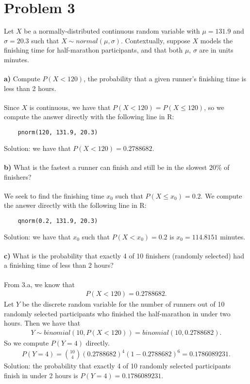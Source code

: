 \documentclass[11pt, letterpaper]{article}
\begin{document}
\section*{Problem 3}
Let $X$ be a normally-distributed continuous random variable with $\mu=131.9$ and $\sigma=20.3$ such that
$X\sim normal(\mu,\sigma)$. Contextually, suppose $X$ models the finishing time for half-marathon participants,
and that both $\mu$, $\sigma$ are in units minutes. \\\\
{\bf a)} Compute $P(X<120)$, the probability that a given runner's finishing time is less than 2 hours. \\\\
Since $X$ is continuous, we have that $P(X<120)=P(X\leq 120)$, so we compute the answer directly with
the following line in R:
\begin{verbatim}
    pnorm(120, 131.9, 20.3)
\end{verbatim}
Solution: we have that $P(X<120)=0.2788682$.\\\\
{\bf b)} What is the fastest a runner can finish and still be in the slowest $20\%$ of finishers?\\\\
We seek to find the finishing time $x_0$ such that $P(X\leq x_0)=0.2$. We compute the answer directly with
the following line in R:
\begin{verbatim}
    qnorm(0.2, 131.9, 20.3)
\end{verbatim}
Solution: we have that $x_0$ such that $P(X<x_0)=0.2$ is $x_0=114.8151$ minutes.\\\\
{\bf c)} What is the probability that exactly 4 of 10 finishers (randomly selected) had a finishing time
of less than 2 hours?\\\\
From 3.a, we know that
\begin{align*}
    P(X<120)=0.2788682.
\end{align*}
Let $Y$ be the discrete random variable for the number of runners out of 10 randomly selected participants
who finished the half-marathon in under two hours. Then we have that 
\begin{align*}
    Y\sim binomial(10, P(X<120))=binomial(10, 0.2788682).
\end{align*}
So we compute $P(Y=4)$ directly.
\begin{align*}
    P(Y=4)={10\choose 4}(0.2788682)^4(1-0.2788682)^6=0.1786089231.
\end{align*}
Solution: the probability that exactly 4 of 10 randomly selected participants finish in under 2 hours is 
$P(Y=4)=0.1786089231$.
\end{document}
